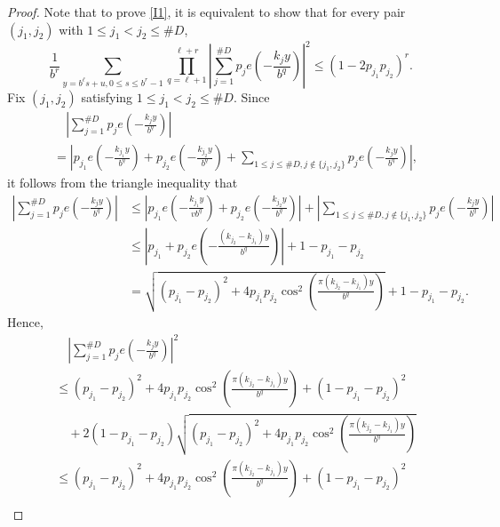 \documentclass[amssymb,amsfonts,refcheck,12pt,verbatim,righttag]{amsart}
\numberwithin{equation}{section} %
\theoremstyle{plain}
\begin{document}
\begin{proof} 
Note that to prove \eqref{I1}, it is equivalent to show that  for every pair $(j_{1},j_{2})$ with $1\leq j_{1}<j_{2}\leq\#D$,
	$$\frac{1}{b^{r}}\sum_{y=b^{\ell}s+u, 0\leq s\leq b^{r}-1}\prod_{q=\ell+1}^{\ell+r}\left|\sum_{j=1}^{\#D}p_{j}e\left(-\frac{k_{j}y}{b^{q}}\right)\right|^{2}\leq\left(1-2p_{j_{1}}p_{j_{2}}\right)^{r}.$$
	Fix $(j_{1},j_{2})$ satisfying $1\leq j_{1}<j_{2}\leq\#D$. Since
	\begin{equation*}
    \begin{aligned}
&\quad\left|\sum_{j=1}^{\#D}p_{j}e\left(-\frac{k_{j}y}{b^{q}}\right)\right| \\
&=\left|p_{j_{1}}e\left(-\frac{k_{j_{1}}y}{b^{q}}\right)+p_{j_{2}}e\left(-\frac{k_{j_{2}}y}{b^{q}}\right)
		+\sum_{1\leq j\leq \#D,j\notin\{j_{1},j_{2}\}}p_{j}e\left(-\frac{k_{j}y}{b^{q}}\right)\right|,
    \end{aligned}
	\end{equation*}
	it follows from the triangle inequality that
	\begin{equation*}
		\begin{aligned}
			\left|\sum_{j=1}^{\#D}p_{j}e\left(-\frac{k_{j}y}{b^{q}}\right)\right|&\leq\left|p_{j_{1}}e\left(-\frac{k_{j_{1}}y}{vb^{q}}\right)+p_{j_{2}}e\left(-\frac{k_{j_{2}}y}{b^{q}}\right)\right|
			+\left|\sum_{1\leq j\leq\#D,j\notin\{j_{1},j_{2}\}}p_{j}e\left(-\frac{k_{j}y}{b^{q}}\right)\right| \\
			&\leq\left|p_{j_{1}}+p_{j_{2}}e\left(-\frac{(k_{j_{2}}-k_{j_{1}})y}{b^{q}}\right)\right|+1-p_{j_{1}}-p_{j_{2}} \\
			&=\sqrt{(p_{j_{1}}-p_{j_{2}})^{2}+4p_{j_{1}}p_{j_{2}}\cos^{2}\left(\frac{\pi(k_{j_{2}}-k_{j_{1}})y}{b^{q}}\right)}+1-p_{j_{1}}-p_{j_{2}}.
		\end{aligned}
	\end{equation*}
	Hence,
	\begin{equation*}
		\begin{aligned}
			&\quad\left|\sum_{j=1}^{\#D}p_{j}e\left(-\frac{k_{j}y}{b^{q}}\right)\right|^{2} \\
			&\leq(p_{j_{1}}-p_{j_{2}})^{2}+4p_{j_{1}}p_{j_{2}}\cos^{2}\left(\frac{\pi(k_{j_{2}}-k_{j_{1}})y}{b^{q}}\right)+(1-p_{j_{1}}-p_{j_{2}})^{2} \\
			&\quad +2(1-p_{j_{1}}-p_{j_{2}})\sqrt{(p_{j_{1}}-p_{j_{2}})^{2}+4p_{j_{1}}p_{j_{2}}\cos^{2}\left(\frac{\pi(k_{j_{2}}-k_{j_{1}})y}{b^{q}}\right)} \\
			&\leq(p_{j_{1}}-p_{j_{2}})^{2}+4p_{j_{1}}p_{j_{2}}\cos^{2}\left(\frac{\pi(k_{j_{2}}-k_{j_{1}})y}{b^{q}}\right)+(1-p_{j_{1}}-p_{j_{2}})^{2} \\

\end{aligned}
\end{equation*}
\end{proof}
\end{document}
